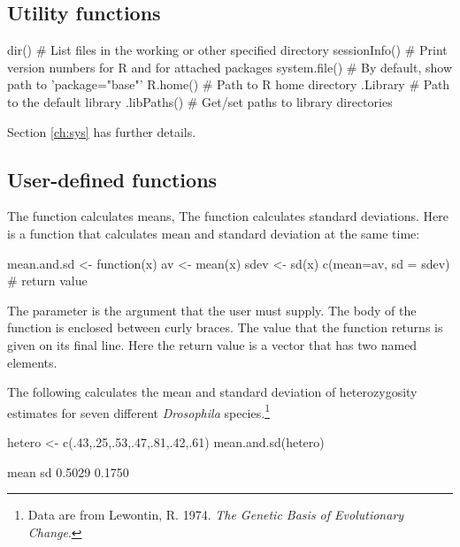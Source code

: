 \subsection{Utility functions}
\begin{fullwidth}
\begin{verbcode}
dir()             # List files in the working or other specified directory
sessionInfo()     # Print version numbers for R and for attached packages
system.file()     # By default, show path to 'package="base"'
R.home()          # Path to R home directory
.Library          # Path to the default library
.libPaths()       # Get/set paths to library directories
\end{verbcode}
\end{fullwidth}
Section \ref{ch:sys} has further details.

\subsection{User-defined functions}
The function  calculates means, The function 
calculates standard deviations. Here is a function that calculates
mean and standard deviation at the same time:
\begin{Schunk}
\begin{Sinput}
mean.and.sd <- function(x){
    av <- mean(x)
    sdev <- sd(x)
    c(mean=av, sd = sdev)   # return value
}
\end{Sinput}
\end{Schunk}
The parameter  is the argument that the user must supply.
The body of the function is enclosed between curly braces. The value
that the function returns is given on its final line. Here the return
value is a vector that has two named elements.

The following calculates the mean and standard deviation of
heterozygosity estimates for seven different \textit{Drosophila}
species.\footnote{Data are from Lewontin, R. 1974. \textit{The Genetic
    Basis of Evolutionary Change}.}
\begin{Schunk}
\begin{Sinput}
hetero <- c(.43,.25,.53,.47,.81,.42,.61)
mean.and.sd(hetero)
\end{Sinput}
\begin{Soutput}
  mean     sd 
0.5029 0.1750 
\end{Soutput}
\end{Schunk}

